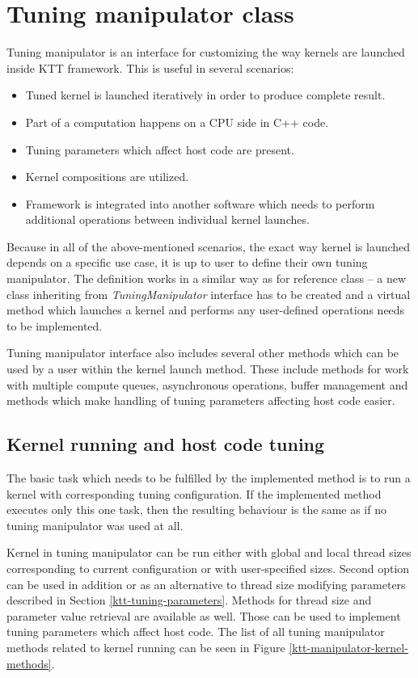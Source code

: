 \documentclass
[
    digital, %
    oneside, %
    table, %
    nolof, %
    nolot, %
    nocover %
]{fithesis3}
\begin{document}
\section{Tuning manipulator class}
\label{ktt-manipulator}
Tuning manipulator is an interface for customizing the way kernels are launched inside KTT framework. This is useful in several scenarios:
\begin{itemize}
    \item Tuned kernel is launched iteratively in order to produce complete result.
    \item Part of a computation happens on a CPU side in C++ code.
    \item Tuning parameters which affect host code are present.
    \item Kernel compositions are utilized.
    \item Framework is integrated into another software which needs to perform additional operations between individual kernel launches.
\end{itemize}

Because in all of the above-mentioned scenarios, the exact way kernel is launched depends on a specific use case, it is up to user to define their own
tuning manipulator. The definition works in a similar way as for reference class -- a new class inheriting from \textit{TuningManipulator} interface
has to be created and a virtual method which launches a kernel and performs any user-defined operations needs to be implemented.

Tuning manipulator interface also includes several other methods which can be used by a user within the kernel launch method. These include methods
for work with multiple compute queues, asynchronous operations, buffer management and methods which make handling of tuning parameters affecting
host code easier.

\subsection{Kernel running and host code tuning}
The basic task which needs to be fulfilled by the implemented method is to run a kernel with corresponding tuning configuration. If the implemented
method executes only this one task, then the resulting behaviour is the same as if no tuning manipulator was used at all.

Kernel in tuning manipulator can be run either with global and local thread sizes corresponding to current configuration or with user-specified sizes.
Second option can be used in addition or as an alternative to thread size modifying parameters described in Section \ref{ktt-tuning-parameters}.
Methods for thread size and parameter value retrieval are available as well. Those can be used to implement tuning parameters which affect host code.
The list of all tuning manipulator methods related to kernel running can be seen in Figure \ref{ktt-manipulator-kernel-methods}.
\end{document}
